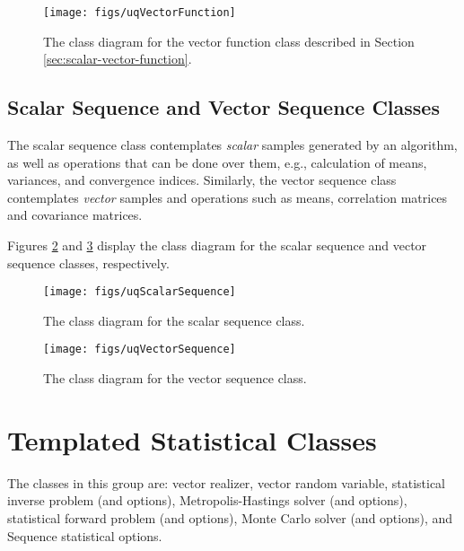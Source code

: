 \begin{figure}[htpb]
\centering
\texttt{[image: figs/uqVectorFunction]}
\vspace{-18pt}
\caption{The class diagram for the vector function class described in Section \ref{sec:scalar-vector-function}.} %
\label{fig-vector-function-class}
\end{figure}


\subsection{Scalar Sequence and Vector Sequence Classes}\label{sec:scalar-vector-sequence}
%
The scalar sequence class contemplates {\it scalar} samples generated by an algorithm, as well as operations that can
be done over them, e.g., calculation of means, variances, and convergence indices.
Similarly, the vector sequence class contemplates {\it vector} samples and operations such as means, correlation matrices and covariance matrices.

Figures \ref{fig-scalar-sequence-class} and \ref{fig-vector-sequence-class} display the class diagram for the scalar sequence  and vector sequence classes, respectively.

\begin{figure}[htpb]
\centering
\texttt{[image: figs/uqScalarSequence]}
\vspace{-8pt}
\caption{The class diagram for the scalar sequence class.}
\label{fig-scalar-sequence-class}
\end{figure}

\begin{figure}[htpb]
\centering
\texttt{[image: figs/uqVectorSequence]}
\vspace{-8pt}
\caption{The class diagram for the vector sequence class.}
\label{fig-vector-sequence-class}
\end{figure}



\section{Templated Statistical Classes}

The classes in this group are: vector realizer, vector random variable, statistical inverse problem (and options), Metropolis-Hastings solver (and options), statistical forward problem (and options), Monte Carlo solver (and options), and Sequence statistical options.

